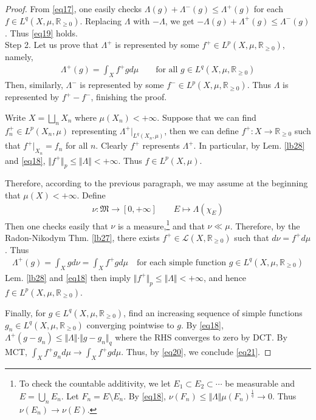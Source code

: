 \documentclass[12pt,b5paper,notitlepage]{article}
\theoremstyle{definition}
\theoremstyle{plain}
\newcommand{\fk}{\mathfrak}
\newcommand{\mc}{\mathcal}
\newcommand{\Rbb}{\mathbb R}
\numberwithin{equation}{section}
\begin{document}
\begin{proof}[Proof]
From \eqref{eq17}, one easily checks $\Lambda(g)+\Lambda^-(g)\leq\Lambda^+(g)$ for each $f\in L^q(X,\mu,\Rbb_{\geq0})$. Replacing $\Lambda$ with $-\Lambda$, we get $-\Lambda(g)+\Lambda^+(g)\leq \Lambda^-(g)$. Thus \eqref{eq19} holds.\\[-1ex]




Step 2. Let us prove that $\Lambda^+$ is represented by some $f^+\in L^p(X,\mu,\Rbb_{\geq0})$, namely,
\begin{align}\label{eq21}
\Lambda^+(g)=\int_X f^+gd\mu\qquad\text{for all }g\in L^q(X,\mu,\Rbb_{\geq0})
\end{align}
Then, similarly, $\Lambda^-$ is represented by some $f^-\in L^p(X,\mu,\Rbb_{\geq0})$. Thus $\Lambda$ is represented by $f^+-f^-$, finishing the proof.

Write $X=\bigsqcup_n X_n$ where $\mu(X_n)<+\infty$. Suppose that we can find $f_n^+\in L^p(X_n,\mu)$ representing $\Lambda^+|_{L^q(X_n,\mu)}$, then we can define $f^+:X\rightarrow\Rbb_{\geq0}$ such that $f^+|_{X_n}=f_n$ for all $n$. Clearly $f^+$ represents $\Lambda^+$. In particular, by Lem. \ref{lb28} and \eqref{eq18}, $\Vert f^+\Vert_p\leq\Vert\Lambda\Vert<+\infty$. Thus $f\in L^p(X,\mu)$.


Therefore, according to the previous paragraph, we may assume at the beginning that $\mu(X)<+\infty$. Define
\begin{align*}
\nu:\fk M\rightarrow[0,+\infty]\qquad E\mapsto \Lambda(\chi_E)
\end{align*}
Then one checks easily that $\nu$ is a measure,\footnote{To check the countable additivity, we let $E_1\subset E_2\subset\cdots$ be measurable and $E=\bigcup_n E_n$. Let $F_n=E\setminus E_n$. By \eqref{eq18}, $\nu(F_n)\leq\Vert\Lambda\Vert\mu(F_n)^{\frac 1q}\rightarrow0$. Thus $\nu(E_n)\rightarrow\nu(E)$.} and that $\nu\ll\mu$. Therefore, by the Radon-Nikodym Thm. \ref{lb27}, there exists $f^+\in\mc L(X,\Rbb_{\geq0})$ such that $d\nu=f^+d\mu$. Thus
\begin{align}\label{eq20}
\Lambda^+(g)=\int_X gd\nu=\int_X f^+gd\mu\quad\text{for each simple function $g\in L^q(X,\mu,\Rbb_{\geq0})$}
\end{align}
Lem. \ref{lb28} and \eqref{eq18} then imply $\Vert f^+\Vert_p\leq \Vert\Lambda\Vert<+\infty$, and hence $f\in L^p(X,\mu,\Rbb_{\geq0})$. 

Finally, for $g\in L^q(X,\mu,\Rbb_{\geq0})$, find an increasing sequence of simple functions $g_n\in L^q(X,\mu,\Rbb_{\geq0})$ converging pointwise to $g$. By \eqref{eq18}, $\Lambda^+(g-g_n)\leq \Vert\Lambda\Vert\cdot\Vert g-g_n\Vert_q$ where the RHS converges to zero by DCT. By MCT, $\int_Xf^+g_nd\mu\rightarrow\int_X f^+gd\mu$. Thus, by \eqref{eq20}, we conclude \eqref{eq21}.
\end{proof}
\end{document}
